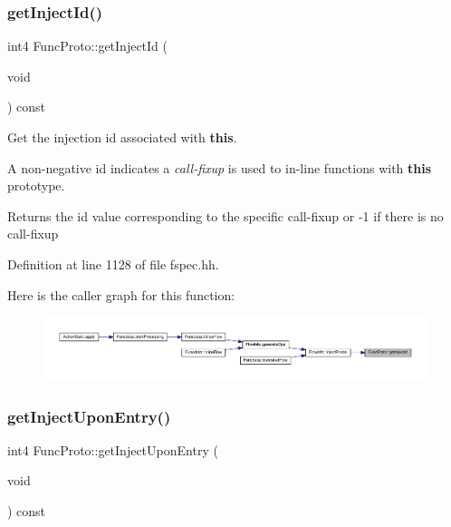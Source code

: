 \subsubsection{\texorpdfstring{getInjectId()}{getInjectId()}}
{\footnotesize\ttfamily int4 Func\+Proto\+::get\+Inject\+Id (\begin{DoxyParamCaption}\item[{void}]{ }\end{DoxyParamCaption}) const\hspace{0.3cm}{\ttfamily [inline]}}



Get the injection id associated with {\bfseries{this}}. 

A non-\/negative id indicates a {\itshape call-\/fixup} is used to in-\/line function\textquotesingle{}s with {\bfseries{this}} prototype. \begin{DoxyReturn}{Returns}
the id value corresponding to the specific call-\/fixup or -\/1 if there is no call-\/fixup 
\end{DoxyReturn}


Definition at line 1128 of file fspec.\+hh.

Here is the caller graph for this function\+:
\nopagebreak
\begin{figure}[H]
\begin{center}
\leavevmode
\includegraphics[width=350pt]{class_func_proto_a88af8e37c1ddb25fd9d6d8322ec436c6_icgraph}
\end{center}
\end{figure}
\mbox{\label{class_func_proto_aa68fc3fa0f616ed233026bcb415a1143}} 
\subsubsection{\texorpdfstring{getInjectUponEntry()}{getInjectUponEntry()}}
{\footnotesize\ttfamily int4 Func\+Proto\+::get\+Inject\+Upon\+Entry (\begin{DoxyParamCaption}\item[{void}]{ }\end{DoxyParamCaption}) const\hspace{0.3cm}{\ttfamily [inline]}}



